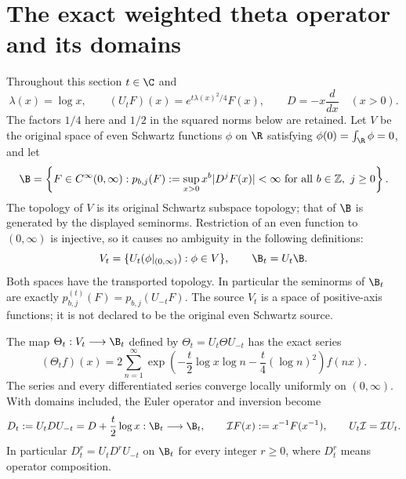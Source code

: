 \section{The exact weighted theta operator and its domains}
\label{wt:sec:theta}

Throughout this section $t\in\C$ and
\[
 \lambda(x)=\log x,\qquad
 (U_tF)(x)=e^{t\lambda(x)^2/4}F(x),\qquad
 D=-x\frac{d}{dx}\quad(x>0).
\]
The factors $1/4$ here and $1/2$ in the squared norms below are
retained.  Let $V$ be the original space of even Schwartz functions
$\phi$ on $\R$ satisfying $\phi(0)=\int_\R\phi=0$, and let
\[
 \B=\left\{F\in C^\infty(0,\infty):
  p_{b,j}(F):=\sup_{x>0}x^b|D^jF(x)|<\infty
  \text{ for all }b\in\mathbb Z,\ j\geq0\right\}.
\]
The topology of $V$ is its original Schwartz subspace topology;
that of $\B$ is generated by the displayed seminorms.  Restriction
of an even function to $(0,\infty)$ is injective, so it causes no
ambiguity in the following definitions:
\begin{equation}\label{wt:eq:spaces}
 V_t=\{U_t(\phi|_{(0,\infty)}):\phi\in V\},\qquad
 \B_t=U_t\B.
\end{equation}
Both spaces have the transported topology.  In particular the
seminorms of $\B_t$ are exactly
$p^{(t)}_{b,j}(F)=p_{b,j}(U_{-t}F)$.  The source $V_t$ is a space
of positive-axis functions; it is not declared to be the original
even Schwartz source.

\begin{theorem}\label{wt:thm:theta}
The map $\Theta_t:V_t\longrightarrow\B_t$ defined by
$\Theta_t=U_t\Theta U_{-t}$ has the exact series
\begin{equation}\label{wt:eq:theta-series}
 (\Theta_tf)(x)
 =2\sum_{n=1}^{\infty}
 \exp\!\left(-\frac t2\log x\log n-\frac t4(\log n)^2\right)f(nx).
\end{equation}
The series and every differentiated series converge locally
uniformly on $(0,\infty)$.  With domains included, the Euler
operator and inversion become
\begin{equation}\label{wt:eq:Euler-reflection}
 D_t:=U_tDU_{-t}=D+\frac t2\log x:\B_t\longrightarrow\B_t,
 \qquad
 \mathcal I F(x):=x^{-1}F(x^{-1}),\qquad
 U_t\mathcal I=\mathcal I U_t.
\end{equation}
In particular $D_t^r=U_tD^rU_{-t}$ on $\B_t$ for every
integer $r\geq0$, where $D_t^r$ means operator composition.
\end{theorem}

